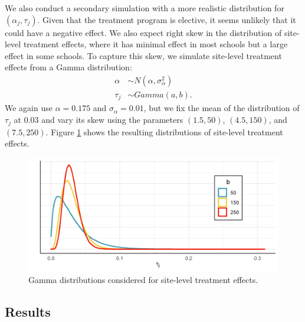 \documentclass[]{article}
\begin{document}
We also conduct a secondary simulation with a more realistic distribution for $(\alpha_j, \tau_j)$.
Given that the treatment program is elective, it seems unlikely that it could have a negative effect.
We also expect right skew in the distribution of site-level treatment effects, where it has minimal effect in most schools but a large effect in some schools.
To capture this skew, we simulate site-level treatment effects from a Gamma distribution:
\begin{align*}
    \alpha &\sim N(\alpha, \sigma^2_\alpha) \\
    \tau_j &\sim Gamma(a, b).
\end{align*}
We again use $\alpha = 0.175$ and $\sigma_\alpha=0.01$, but we fix the mean of the distribution of $\tau_j$ at 0.03 and vary its skew using the parameters $(1.5, 50)$, $(4.5, 150)$, and $(7.5, 250)$.
Figure \ref{fig:gammas} shows the resulting distributions of site-level treatment effects.
\begin{figure}
    \centering
    \includegraphics[width = \textwidth]{writeup/images/gamma.png}
    \caption{Gamma distributions considered for site-level treatment effects.}
    \label{fig:gammas}
\end{figure}

\subsection{Results}
\end{document}
